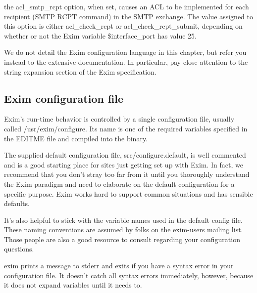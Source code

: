 
the {acl\_smtp\_rcpt} option, when set, causes an ACL to be implemented
for each recipient (SMTP RCPT command) in the SMTP exchange. The value
assigned to this option is either {acl\_check\_rcpt} or
{acl\_check\_rcpt\_submit}, depending on whether or not the Exim
variable {\$interface\_port} has value 25.

We do not detail the Exim configuration language in this chapter, but
refer you instead to the extensive documentation. In particular, pay
close attention to the string expansion section of the Exim
specification.

\protect\hypertarget{part0026_split_045.html}{}{}

\hypertarget{part0026_split_045.htmlux5cux23_idContainer1247}{}
\hypertarget{part0026_split_045.htmlux5cux23calibre_pb_44}{%
\subsection[Exim configuration
file]{\texorpdfstring{\protect\hypertarget{part0026_split_045.htmlux5cux23_idTextAnchor1135}{}{}Exim
configuration
file}{Exim configuration file}}\label{part0026_split_045.htmlux5cux23calibre_pb_44}}

Exim's run-time behavior is controlled by a single configuration file,
usually called
\protect\hypertarget{part0026_split_045.htmlux5cux23_idIndexMarker2641}{}{}{/usr/exim/configure}.
Its name is one of the required variables specified in the {EDITME} file
and compiled into the binary.

The supplied default configuration file, {src/configure.default}, is
well commented and is a good starting place for sites just getting set
up with Exim. In fact, we recommend that you don't stray too far from it
until you thoroughly understand the Exim paradigm and need to elaborate
on the default configuration for a specific purpose. Exim works hard to
support common situations and has sensible defaults.

It's also helpful to stick with the variable names used in the default
config file. These naming conventions are assumed by folks on the
exim-users mailing list. Those people are also a good resource to
consult regarding your configuration questions.

{exim} prints a message to stderr and exits if you have a syntax error
in your configuration file. It doesn't catch all syntax errors
immediately, however, because it does not expand variables until it
needs to.

